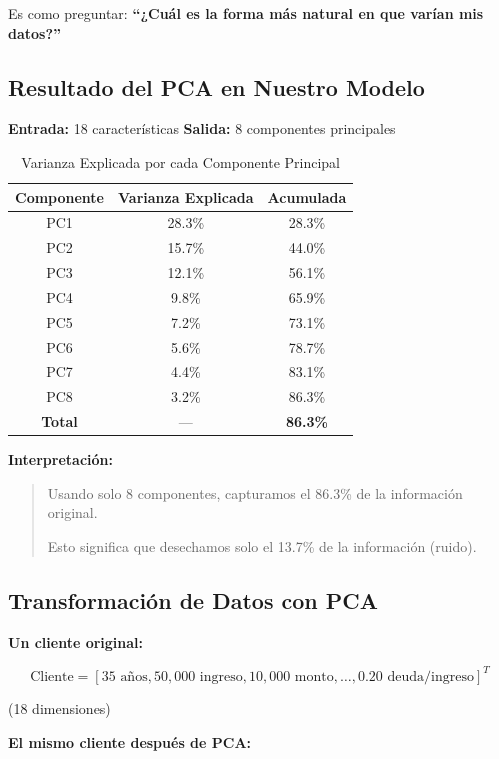 \documentclass[11pt,a4paper,spanish]{article}
\begin{document}
Es como preguntar: \textbf{``¿Cuál es la forma más natural en que varían mis datos?''}

\subsection{Resultado del PCA en Nuestro Modelo}

\textbf{Entrada:} 18 características  
\textbf{Salida:} 8 componentes principales

\begin{table}[H]
\centering
\begin{tabular}{|c|c|c|}
\hline
\textbf{Componente} & \textbf{Varianza Explicada} & \textbf{Acumulada} \\
\hline
PC1 & 28.3\% & 28.3\% \\
PC2 & 15.7\% & 44.0\% \\
PC3 & 12.1\% & 56.1\% \\
PC4 & 9.8\% & 65.9\% \\
PC5 & 7.2\% & 73.1\% \\
PC6 & 5.6\% & 78.7\% \\
PC7 & 4.4\% & 83.1\% \\
PC8 & 3.2\% & 86.3\% \\
\hline
\textbf{Total} & --- & \textbf{86.3\%} \\
\hline
\end{tabular}
\caption{Varianza Explicada por cada Componente Principal}
\end{table}

\textbf{Interpretación:}

\begin{quote}
Usando solo 8 componentes, capturamos el 86.3\% de la información original.

Esto significa que desechamos solo el 13.7\% de la información (ruido).
\end{quote}

\subsection{Transformación de Datos con PCA}

\textbf{Un cliente original:}

\[
\text{Cliente} = [35 \text{ años}, 50,000 \text{ ingreso}, 10,000 \text{ monto}, \ldots, 0.20 \text{ deuda/ingreso}]^T
\]

(18 dimensiones)

\textbf{El mismo cliente después de PCA:}
\end{document}
